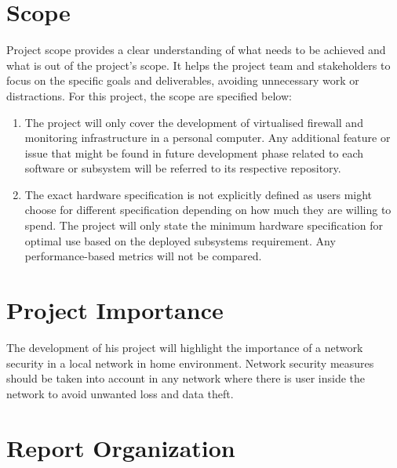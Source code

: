 \documentclass[../index.tex]{subfiles}
\begin{document}
\section{Scope}

Project scope provides a clear understanding of what needs to be achieved and what is out of the
project's scope. It helps the project team and stakeholders to focus on the specific goals and
deliverables, avoiding unnecessary work or distractions. For this project, the scope are specified
below:

\begin{enumerate}

  \item The project will only cover the development of virtualised firewall and monitoring
    infrastructure in a personal computer. Any additional feature or issue that might be found in
    future development phase related to each software or subsystem will be referred to its
    respective repository.

    \item The exact hardware specification is not explicitly defined as users might choose for
      different specification depending on how much they are willing to spend. The project will only
      state the minimum hardware specification for optimal use based on the deployed subsystems
      requirement. Any performance-based metrics will not be compared.
  
\end{enumerate}

\section{Project Importance}

The development of his project will highlight the importance of a network security in a local
network in home environment. Network security measures should be taken into account in any network
where there is user inside the network to avoid unwanted loss and data theft.

\section{Report Organization}
\end{document}
